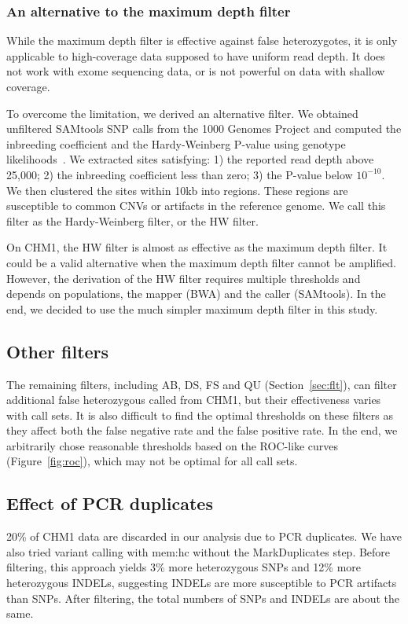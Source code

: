 \documentclass{bioinfo}
\begin{document}
\subsubsection{An alternative to the maximum depth filter}
While the maximum depth filter is effective against false heterozygotes, it is
only applicable to high-coverage data supposed to have uniform read depth. It
does not work with exome sequencing data, or is not powerful on data with
shallow coverage.

To overcome the limitation, we derived an alternative filter. We obtained
unfiltered SAMtools SNP calls from the 1000 Genomes Project and computed the
inbreeding coefficient and the Hardy-Weinberg P-value using genotype
likelihoods~\citep{Li:2011ab}. We extracted sites satisfying: 1) the reported
read depth above 25,000; 2) the inbreeding coefficient less than zero; 3) the
P-value below $10^{-10}$. We then clustered the sites within 10kb into regions.
These regions are susceptible to common CNVs or artifacts in the reference
genome. We call this filter as the Hardy-Weinberg filter, or the HW filter.

On CHM1, the HW filter is almost as effective as the maximum depth filter.
It could be a valid alternative when the maximum depth filter cannot be
amplified.  However, the derivation of the HW filter requires multiple
thresholds and depends on populations, the mapper (BWA) and the caller
(SAMtools). In the end, we decided to use the much simpler maximum depth filter
in this study.

\subsection{Other filters}
The remaining filters, including AB, DS, FS and QU (Section~\ref{sec:flt}), can
filter additional false heterozygous called from CHM1, but their effectiveness
varies with call sets. It is also difficult to find the optimal thresholds on
these filters as they affect both the false negative rate and the false
positive rate. In the end, we arbitrarily chose reasonable thresholds based on
the ROC-like curves (Figure~\ref{fig:roc}), which may not be optimal for all
call sets.

\subsection{Effect of PCR duplicates}
20\% of CHM1 data are discarded in our analysis due to PCR duplicates. We have
also tried variant calling with mem:hc without the MarkDuplicates step. Before
filtering, this approach yields 3\% more heterozygous SNPs and 12\% more
heterozygous INDELs, suggesting INDELs are more susceptible to PCR artifacts
than SNPs. After filtering, the total numbers of SNPs and INDELs are about the
same.
\end{document}
